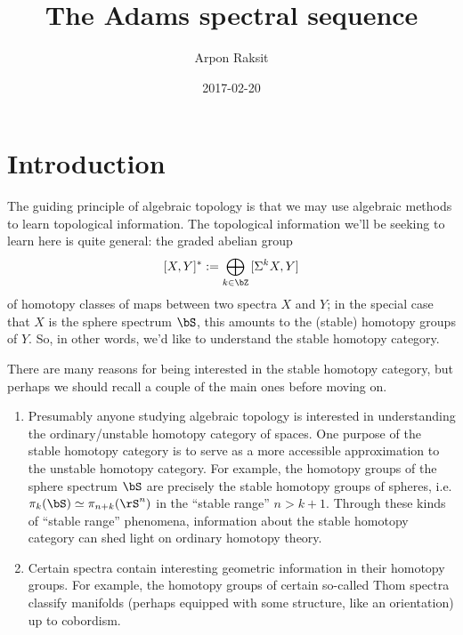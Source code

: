 


\title{The Adams spectral sequence}
\author{Arpon Raksit}
\date{2017-02-20}




\maketitle

\newcommand{\AbGrps}{\mathrm{AbGrps}}
\newcommand{\CP}{\mathbf{CP}}
\newcommand{\gr}{\mathrm{gr}}
\newcommand{\HFp}{\rH\bF_p}
\newcommand{\Mods}{\mathrm{Mods}}
\newcommand{\Spectra}{\mathrm{Spectra}}
\newcommand{\Sq}{\operatorname{Sq}}


\section{Introduction}
\label{intro}

The guiding principle of algebraic topology is that we may use algebraic methods to learn topological information. The topological information we'll be seeking to learn here is quite general: the graded abelian group
\[
  [X,Y]^* \ce \bigoplus_{k \in \bZ} {[\Sigma^k X, Y]}
\]
of homotopy classes of maps between two spectra $X$ and $Y$; in the special case that $X$ is the sphere spectrum $\bS$, this amounts to the (stable) homotopy groups of $Y$. So, in other words, we'd like to understand the stable homotopy category.

\begin{remark}
  \label{intro-spectra-motivation}
  There are many reasons for being interested in the stable homotopy category, but perhaps we should recall a couple of the main ones before moving on.
  \begin{enumerate}
  \item Presumably anyone studying algebraic topology is interested in understanding the ordinary/unstable homotopy category of spaces. One purpose of the stable homotopy category is to serve as a more accessible approximation to the unstable homotopy category. For example, the homotopy groups of the sphere spectrum $\bS$ are precisely the stable homotopy groups of spheres, i.e. $\pi_k(\bS) \iso \pi_{n+k}(\rS^n)$ in the ``stable range'' $n > k + 1$. Through these kinds of ``stable range'' phenomena, information about the stable homotopy category can shed light on ordinary homotopy theory.
  \item Certain spectra contain interesting geometric information in their homotopy groups. For example, the homotopy groups of certain so-called Thom spectra classify manifolds (perhaps equipped with some structure, like an orientation) up to cobordism.
  \end{enumerate}
\end{remark}

